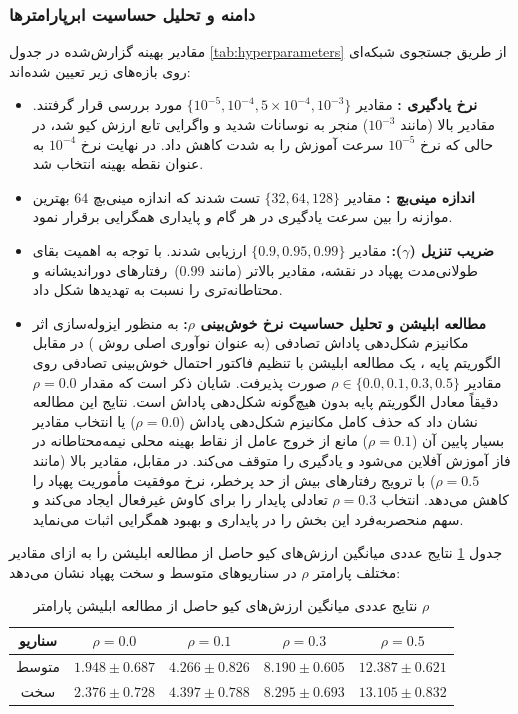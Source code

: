 \documentclass[oneside,openany,a4paper,12pt]{article}
\begin{document}
\subsubsection{دامنه و تحلیل حساسیت ابرپارامترها}
مقادیر بهینه گزارش‌شده در جدول \ref{tab:hyperparameters} از طریق جستجوی شبکه‌ای  روی بازه‌های زیر تعیین شده‌اند:
\begin{itemize}
    \item \textbf{نرخ یادگیری :} مقادیر $\{10^{-5}, 10^{-4}, 5 \times 10^{-4}, 10^{-3}\}$ مورد بررسی قرار گرفتند. مقادیر بالا (مانند $10^{-3}$) منجر به نوسانات شدید و واگرایی تابع ارزش کیو شد، در حالی که نرخ $10^{-5}$ سرعت آموزش را به شدت کاهش داد. در نهایت نرخ $10^{-4}$ به عنوان نقطه بهینه انتخاب شد.
    \item \textbf{اندازه مینی‌بچ :} مقادیر $\{32, 64, 128\}$ تست شدند که اندازه مینی‌بچ $64$ بهترین موازنه را بین سرعت یادگیری در هر گام و پایداری همگرایی برقرار نمود.
    \item \textbf{ضریب تنزیل ($\gamma$):} مقادیر $\{0.9, 0.95, 0.99\}$ ارزیابی شدند. با توجه به اهمیت بقای طولانی‌مدت پهپاد در نقشه، مقادیر بالاتر (مانند $0.99$)\ رفتارهای دوراندیشانه و محتاطانه‌تری را نسبت به تهدیدها شکل داد.
    \item \textbf{مطالعه ابلیشن و تحلیل حساسیت نرخ خوش‌بینی $\rho$:} به منظور ایزوله‌سازی اثر مکانیزم شکل‌دهی پاداش تصادفی (به عنوان نوآوری اصلی روش ) در مقابل الگوریتم پایه ، یک مطالعه ابلیشن  با تنظیم فاکتور احتمال خوش‌بینی تصادفی روی مقادیر $\rho \in \{0.0, 0.1, 0.3, 0.5\}$ صورت پذیرفت. شایان ذکر است که مقدار $\rho = 0.0$ دقیقاً معادل الگوریتم  پایه بدون هیچ‌گونه شکل‌دهی پاداش است. نتایج این مطالعه نشان داد که حذف کامل مکانیزم شکل‌دهی پاداش ($\rho=0.0$) یا انتخاب مقادیر بسیار پایین آن ($\rho=0.1$) مانع از خروج عامل از نقاط بهینه محلی نیمه‌محتاطانه در فاز آموزش آفلاین می‌شود و یادگیری را متوقف می‌کند. در مقابل، مقادیر بالا (مانند $\rho=0.5$) با ترویج رفتارهای بیش از حد پرخطر، نرخ موفقیت مأموریت پهپاد را کاهش می‌دهد. انتخاب $\rho=0.3$ تعادلی پایدار را برای کاوش غیرفعال ایجاد می‌کند و سهم منحصربه‌فرد این بخش را در پایداری و بهبود همگرایی اثبات می‌نماید.
\end{itemize}

جدول \ref{tab:ablation_results} نتایج عددی میانگین ارزش‌های کیو حاصل از مطالعه ابلیشن را به ازای مقادیر مختلف پارامتر $\rho$ در سناریوهای متوسط و سخت پهپاد نشان می‌دهد:
\begin{table}[H]
\centering
\caption{نتایج عددی میانگین ارزش‌های کیو حاصل از مطالعه ابلیشن پارامتر $\rho$}
\label{tab:ablation_results}
\begin{tabular}{ccccc}
\hline
\textbf{سناریو} & \textbf{$\rho = 0.0$} & \textbf{$\rho = 0.1$} & \textbf{$\rho = 0.3$} & \textbf{$\rho = 0.5$} \\ \hline
متوسط & $1.948 \pm 0.687$ & $4.266 \pm 0.826$ & $8.190 \pm 0.605$ & $12.387 \pm 0.621$ \\
سخت & $2.376 \pm 0.728$ & $4.397 \pm 0.788$ & $8.295 \pm 0.693$ & $13.105 \pm 0.832$ \\ \hline
\end{tabular}
\end{table}
\end{document}
